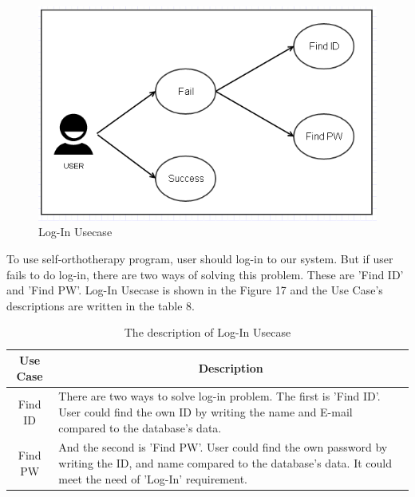 \documentclass[conference]{IEEEtran}
\begin{document}
\begin{figure}[H]
\begin{center}
    \includegraphics[scale=0.5]{img_18.png}
    \caption{Log-In Usecase} 
\end{center}
\end{figure}
 		
To use self-orthotherapy program, user should log-in to our system. But if user fails to do log-in, there are two ways of solving this problem. These are 'Find ID' and 'Find PW'. Log-In Usecase is shown in the Figure 17 and the Use Case's descriptions are written in the table 8.  




\begin{table}[h]
{\renewcommand\arraystretch{1.25}
\caption{The description of Log-In Usecase}
\begin{tabular}{|c|l|l|} \hline
Use Case & \multicolumn{2}{c|}{Description} \\ \hline\hline
Find ID& \multicolumn{2}{p{6.75cm}|}{\raggedright There are two ways to solve log-in problem. The first is 'Find ID'. User could find the own ID by writing the name and E-mail compared to the database's data.} \\ \hline
Find PW& \multicolumn{2}{p{6.75cm}|}{\raggedright And the second is 'Find PW'. User could find the own password by writing the ID, and name compared to the database's data. It could meet the need of 'Log-In' requirement.} \\ \hline
\end{tabular}}
\end{table}
\end{document}
